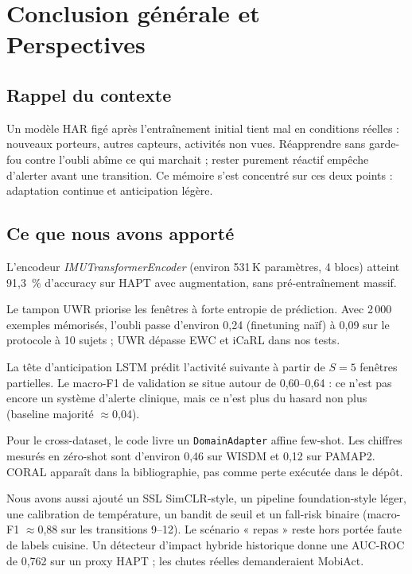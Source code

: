 \chapter*{Conclusion générale et Perspectives}
\label{sec:conclusion}

\section{Rappel du contexte}

Un modèle HAR figé après l'entraînement initial tient mal en conditions
réelles : nouveaux porteurs, autres capteurs, activités non vues. Réapprendre
sans garde-fou contre l'oubli abîme ce qui marchait ; rester purement réactif
empêche d'alerter avant une transition. Ce mémoire s'est concentré sur ces
deux points : adaptation continue et anticipation légère.

\section{Ce que nous avons apporté}

L'encodeur \emph{IMUTransformerEncoder} (environ 531\,K paramètres, 4 blocs)
atteint 91,3~\% d'accuracy sur HAPT avec augmentation, sans pré-entraînement
massif.

Le tampon UWR priorise les fenêtres à forte entropie de prédiction. Avec
2\,000 exemples mémorisés, l'oubli passe d'environ 0,24 (finetuning naïf) à
0,09 sur le protocole à 10 sujets ; UWR dépasse EWC et iCaRL dans nos tests.

La tête d'anticipation LSTM prédit l'activité suivante à partir de $S=5$
fenêtres partielles. Le macro-F1 de validation se situe autour de 0,60--0,64 :
ce n'est pas encore un système d'alerte clinique, mais ce n'est plus du
hasard non plus (baseline majorité $\approx$0,04).

Pour le cross-dataset, le code livre un \texttt{DomainAdapter} affine
few-shot. Les chiffres mesurés en zéro-shot sont d'environ 0,46 sur WISDM et
0,12 sur PAMAP2. CORAL apparaît dans la bibliographie, pas comme perte
exécutée dans le dépôt.

Nous avons aussi ajouté un SSL SimCLR-style, un pipeline foundation-style
léger, une calibration de température, un bandit de seuil et un fall-risk
binaire (macro-F1 $\approx$0,88 sur les transitions 9--12). Le scénario
« repas » reste hors portée faute de labels cuisine. Un détecteur d'impact
hybride historique donne une AUC-ROC de 0,762 sur un proxy HAPT ; les chutes
réelles demanderaient MobiAct.


